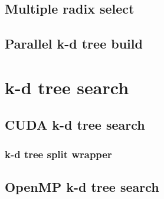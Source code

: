 \begin{appendices}

\subsection{Multiple radix select} %
\label{sec:multiple_radix_select}



\subsection{Parallel k-d tree build} %
\label{sec:paralell_k_d_tree_build}




\section{k-d tree search} %
\label{sec:k_d_tree_search}

\subsection{CUDA k-d tree search} %
\label{sec:cuda_k_d_tree_search}




\subsubsection{k-d tree split wrapper} %
 \label{sub:wrapper}
 






\subsection{OpenMP k-d tree search} %
\label{sec:open_mp_k_d_tree_search}



\end{appendices}
